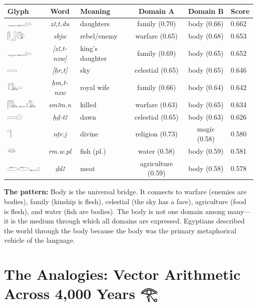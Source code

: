 \documentclass[11pt, a4paper]{article}
\newcommand{\hiero}[1]{{\normalfont\hierofont #1}}
\newenvironment{bridgebox}[1][]{%
  \def\boxtitle{#1}%
  \begin{oframed}%
  \noindent{\bfseries\color{nile!90!black}\boxtitle}\par\smallskip%
}{%
  \end{oframed}%
}
\begin{document}
\begin{bridgebox}[Top Bridge Words by Score]
\begin{center}
\begin{tabular}{lclccl}
\toprule
\textbf{Glyph} & \textbf{Word} & \textbf{Meaning} & \textbf{Domain A} & \textbf{Domain B} & \textbf{Score} \\
\midrule
\hiero{𓊃𓂝𓏏} & \textit{zꜣ,t.du}    & daughters     & family (0.70)   & body (0.66)       & 0.662 \\
\hiero{𓋴𓃀𓇋𓅱} & \textit{sbjw}        & rebel/enemy   & warfare (0.65)  & body (0.68)       & 0.653 \\
\hiero{𓊃𓂝𓏏} & \textit{[zꜣ,t-nzw]} & king's daughter & family (0.69) & body (0.65)       & 0.652 \\
\hiero{𓇯} & \textit{[ḥr,t]}      & sky           & celestial (0.65) & body (0.65)      & 0.646 \\
\hiero{𓎛𓅓𓏏} & \textit{ḥm,t-nzw}   & royal wife    & family (0.66)   & body (0.64)       & 0.642 \\
\hiero{𓋴𓅓𓂝𓅓} & \textit{smꜣm.n}     & killed        & warfare (0.63)  & body (0.65)       & 0.634 \\
\hiero{𓇯𓇳} & \textit{ḥḏ-tꜣ}      & dawn          & celestial (0.65) & body (0.63)      & 0.626 \\
\hiero{𓊹} & \textit{nṯr.j}      & divine        & religion (0.73) & magic (0.58)      & 0.580 \\
\hiero{𓆛} & \textit{rm.w.pl}     & fish (pl.)    & water (0.58)    & body (0.59)       & 0.581 \\
\hiero{𓂧𓂧𓂝} & \textit{ḏdꜣ}         & meat          & agriculture (0.59) & body (0.58)    & 0.578 \\
\bottomrule
\end{tabular}
\end{center}

\medskip
\textbf{The pattern:} Body is the universal bridge. It connects to warfare (enemies are bodies), family (kinship is flesh), celestial (the sky has a face), agriculture (food is flesh), and water (fish are bodies). The body is not one domain among many---it is the medium through which all domains are expressed. Egyptians described the world through the body because the body was the primary metaphorical vehicle of the language.
\end{bridgebox}


\section{The Analogies: Vector Arithmetic Across 4,000 Years \hfill \hiero{𓂀}}
\end{document}
